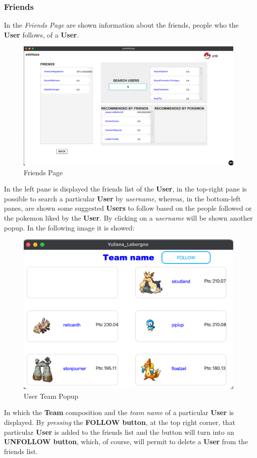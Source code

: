 \subsubsection{Friends}
In the \textit{Friends Page} are shown information about the friends, people who the \textbf{User} follows, of a \textbf{User}. 
\begin{figure}[H]
	\centering
	\includegraphics[width=\textwidth]{img/userManual/friends.png}
	\caption{Friends Page}
\end{figure}
In the left pane is displayed the friends list of the \textbf{User}, in the top-right pane is possible to search a particular \textbf{User} by \textit{username}, whereas, in the bottom-left panes, are shown some suggested \textbf{Users} to follow based on the people followed or the pokemon liked by the \textbf{User}.
By clicking on a \textit{username} will be shown another popup. In the following image it is showed:
\begin{figure}[H]
	\centering
	\includegraphics[width=\textwidth]{img/userManual/team_popup.png}
	\caption{User Team Popup}
\end{figure}
In which the \textbf{Team} composition and the \textit{team name} of a particular \textbf{User} is displayed. By \textit{pressing} the \textbf{FOLLOW button}, at the top right corner, that particular \textbf{User} is added to the friends list and the button will turn into an \textbf{UNFOLLOW button}, which, of course, will permit to delete a \textbf{User} from the friends list.
